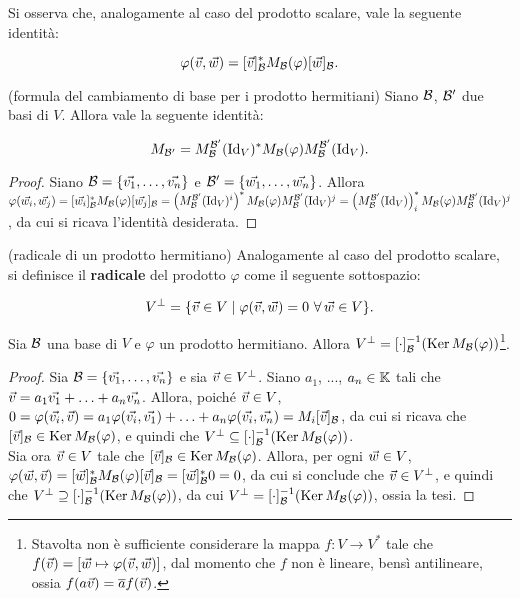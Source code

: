 \begin{remark}
	Si osserva che, analogamente al caso del prodotto scalare, vale
	la seguente identità:
	
	\[ \varphi(\v, \w) = [\v]_\basis^* M_\basis(\varphi) [\w]_\basis. \]
\end{remark}

\begin{proposition}
	(formula del cambiamento di base per i prodotto hermitiani) Siano
	$\mathcal{B}$, $\mathcal{B}'$ due basi di $V$. Allora vale la seguente
	identità:
	
	\[ M_{\mathcal{B}'} = M_{\mathcal{B}}^{\mathcal{B}'}(\operatorname{Id}_V)^* M_{\mathcal{B}}(\varphi) M_{\mathcal{B}}^{\mathcal{B}'}(\operatorname{Id}_V). \]
\end{proposition}

\begin{proof}
	Siano $\basis = \{ \vv 1, \ldots, \vv n \}$ e $\basis' = \{ \ww 1, \ldots, \ww n \}$. Allora $\varphi(\ww i, \ww j) = [\ww i]_\basis^* M_\basis(\varphi) [\ww j]_\basis = \left( M_\basis^{\basis'}(\Idv)^i \right)^* M_\basis(\varphi) M_\basis^{\basis'}(\Idv)^j =
	\left(M_\basis^{\basis'}(\Idv)\right)^*_i M_\basis(\varphi) M_\basis^{\basis'}(\Idv)^j$, da cui si ricava l'identità
	desiderata.
\end{proof}

\begin{definition} (radicale di un prodotto hermitiano)
	Analogamente al caso del prodotto scalare, si definisce il \textbf{radicale} del prodotto $\varphi$ come il seguente sottospazio: 
	
	\[ V^\perp = \{ \v \in V \mid \varphi(\v, \w) = 0 \, \forall \w \in V \}. \]
\end{definition}

\begin{proposition}
	Sia $\mathcal{B}$ una base di $V$ e $\varphi$ un prodotto hermitiano. Allora $V^\perp = [\cdot]_{\mathcal{B}} ^{-1} (\operatorname{Ker} M_{\mathcal{B}}(\varphi))$\footnote{Stavolta non è sufficiente considerare la mappa $f : V \to V^*$ tale che $f(\v) = \left[ \w \mapsto \varphi(\v, \w) \right]$, dal momento che $f$ non è lineare, bensì antilineare, ossia $f(a \v) = \conj a f(\v)$.}.
\end{proposition}

\begin{proof}
	Sia $\basis = \{ \vv 1, \ldots, \vv n \}$ e sia $\v \in V^\perp$.
	Siano $a_1$, ..., $a_n \in \mathbb{K}$ tali che $\v = a_1 \vv 1 + \ldots + a_n \vv n$. Allora, poiché $\v \in V$, $0 = \varphi(\vv i, \v)
	= a_1 \varphi(\vv i, \vv 1) + \ldots + a_n \varphi(\vv i, \vv n) = M_i [\v]_\basis$, da cui si ricava che $[\v]_\basis \in \Ker M_\basis(\varphi)$, e quindi che $V^\perp \subseteq [\cdot]_{\mathcal{B}} ^{-1} (\operatorname{Ker} M_{\mathcal{B}}(\varphi))$. \\
	
	Sia ora $\v \in V$ tale che $[\v]_\basis \in \Ker M_\basis(\varphi)$.
	Allora, per ogni $\w \in V$, $\varphi(\w, \v) = [\w]_\basis^* M_\basis(\varphi) [\v]_\basis = [\w]_\basis^* 0 = 0$, da cui si
	conclude che $\v \in V^\perp$, e quindi che  $V^\perp \supseteq [\cdot]_{\mathcal{B}} ^{-1} (\operatorname{Ker} M_{\mathcal{B}}(\varphi))$, da cui
	$V^\perp = [\cdot]_{\mathcal{B}} ^{-1} (\operatorname{Ker} M_{\mathcal{B}}(\varphi))$, ossia
	la tesi.
\end{proof}

